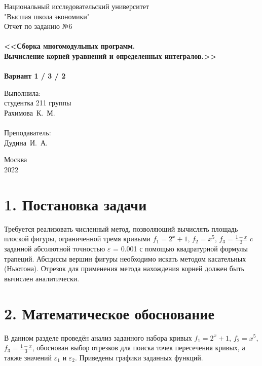 \documentclass[a4paper,12pt,titlepage,finall]{article}
\begin{document}
\begin{titlepage}
    \begin{center}
	{\small \sc Национальный исследовательский университет\\
	"Высшая школа экономики"\\}
	\vfill
	{\Large \sc Отчет по заданию №6}\\
	~\\
	{\large \bf <<Сборка многомодульных программ. \\
	Вычисление корней уравнений и определенных интегралов.>>}\\ 
	~\\
	{\large \bf Вариант 1 / 3 / 2}
    \end{center}
    \begin{flushright}
	\vfill {Выполнила:\\
	студентка 211 группы\\
	Рахимова~К.~М.\\
	~\\
	Преподаватель:\\
	Дудина~И.~А.}
    \end{flushright}
    \begin{center}
	\vfill
	{\small Москва\\2022}
    \end{center}
\end{titlepage}

\tableofcontents
\newpage

\section{1. Постановка задачи}

Требуется реализовать численный метод, позволяющий вычислять площадь плоской фигуры, ограниченной тремя кривыми $f_{1} = 2^x + 1$, $f_{2} = x^5$, $f_{3} = \frac{1-x}{3}$ c заданной абсолютной точностью $\varepsilon$ = 0.001 с помощью квадратурной формулы трапеций. Абсциссы вершин фигуры необходимо искать методом касательных (Ньютона). Отрезок для применения метода нахождения корней должен быть вычислен аналитически.

\newpage

\section{2. Математическое обоснование}
В данном разделе проведён анализ заданного набора кривых $f_{1} = 2^x + 1$, $f_{2} = x^5$, $f_{3} = \frac{1-x}{3}$, обоснован выбор отрезков для поиска точек пересечения кривых, а также значений $\varepsilon_1$ и $\varepsilon_2$. Приведены графики заданных функций.
\newline
\end{document}
